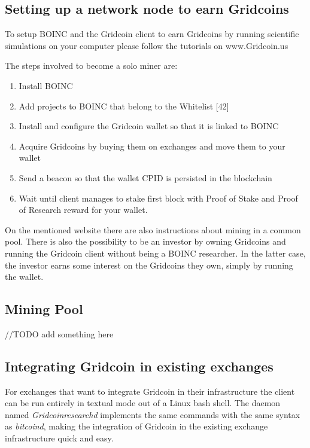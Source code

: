 \subsection{Setting up a network node to earn Gridcoins}

To setup BOINC and the Gridcoin client to earn Gridcoins by running scientific simulations on your computer please follow the tutorials on www.Gridcoin.us

The steps involved to become a solo miner are:
\begin{enumerate}
  \item Install BOINC
  \item Add projects to BOINC that belong to the Whitelist [42]
  \item Install and configure the Gridcoin wallet so that it is linked to BOINC 
  \item Acquire Gridcoins by buying them on exchanges and move them to your wallet
  \item Send a beacon so that the wallet CPID is persisted in the blockchain
  \item Wait until client manages to stake first block with Proof of Stake and Proof of Research reward for your wallet.
\end{enumerate}

On the mentioned website there are also instructions about mining in a common pool. There is also the possibility to be an investor by owning Gridcoins and running the Gridcoin client without being a BOINC researcher. In the latter case, the investor earns some interest on the Gridcoins they own, simply by running the wallet.\\

\subsection{Mining Pool}

//TODO add something here

\subsection{Integrating Gridcoin in existing exchanges}

For exchanges that want to integrate Gridcoin in their infrastructure the client can be run entirely in textual mode out of a Linux bash shell. The daemon named \textit{Gridcoinresearchd} implements the same commands with the same syntax as \textit{bitcoind}, making the integration of Gridcoin in the existing exchange infrastructure quick and easy.\\
